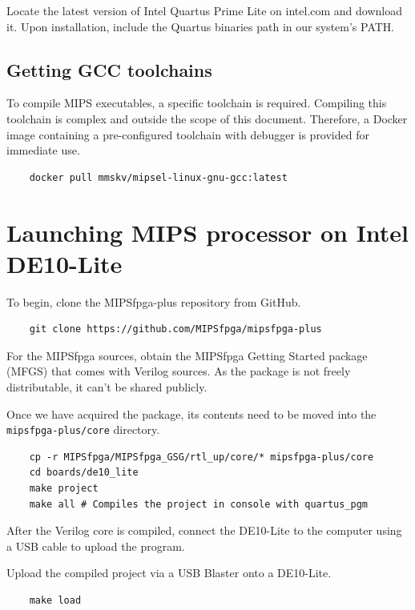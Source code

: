 \documentclass[a4paper]{article}
\let\oldtexttt\texttt
\renewcommand{\texttt}[1]{\textcolor{mygray}{\oldtexttt{#1}}}
\begin{document}
Locate the latest version of Intel Quartus Prime Lite on intel.com and download it. Upon installation, include the Quartus binaries path in our system's PATH.

\subsection{Getting GCC toolchains}

To compile MIPS executables, a specific toolchain is required. Compiling this
toolchain is complex and outside the scope of this document. Therefore, a
Docker image containing a pre-configured toolchain with debugger is provided
for immediate use.

\begin{lstlisting}
    docker pull mmskv/mipsel-linux-gnu-gcc:latest
\end{lstlisting}

\section{Launching MIPS processor on Intel DE10-Lite}

To begin, clone the MIPSfpga-plus repository from GitHub.

\begin{lstlisting}
    git clone https://github.com/MIPSfpga/mipsfpga-plus
\end{lstlisting}

For the MIPSfpga sources, obtain the MIPSfpga Getting Started package (MFGS) that comes with Verilog sources. As the package is not freely distributable, it can't be shared publicly.

Once we have acquired the package, its contents need to be moved into the \texttt{mipsfpga-plus/core} directory.

\begin{lstlisting}
    cp -r MIPSfpga/MIPSfpga_GSG/rtl_up/core/* mipsfpga-plus/core
    cd boards/de10_lite
    make project
    make all # Compiles the project in console with quartus_pgm
\end{lstlisting}

After the Verilog core is compiled, connect the DE10-Lite to the computer using a USB cable to upload the program.

Upload the compiled project via a USB Blaster onto a DE10-Lite.

\begin{lstlisting}
    make load
\end{lstlisting}
\end{document}
